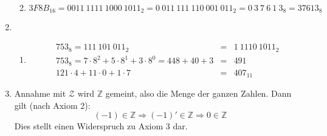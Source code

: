 \documentclass[DIN, pagenumber=false, fontsize=11pt, parskip=half]{scrartcl}
\begin{document}
\begin{enumerate}
\begin{enumerate}
\begin{equation*}
                    \end{equation*}
                \item
                    \begin{equation*}
                        {3F8B}_{16} = {0011\ 1111\ 1000\ 1011}_2 = {0\ 011\ 111\ 110\ 001\ 011}_2 = {0\ 3\ 7\ 6\ 1\ 3}_8 = {37613}_8
                    \end{equation*}
            \end{enumerate}
        \item 
            \begin{enumerate}
                \item 
                    \begin{eqnarray*}
                        {753}_8 = {111\ 101\ 011}_2 &=& {1\ 1110\ 1011}_2 \\
                        {753}_8 = 7 \cdot 8^2 + 5 \cdot 8^1 + 3 \cdot 8^0 = 448 + 40 + 3 &=& 491\\
                        121 \cdot 4 + 11 \cdot 0 + 1 \cdot 7 &=& {407}_{11}
                    \end{eqnarray*}
            \end{enumerate}
        \item Annahme mit $\mathcal{Z}$ wird $\mathbb{Z}$ gemeint, also die Menge der ganzen Zahlen. Dann gilt (nach Axiom 2):
            \begin{equation*}
                (-1) \in \mathbb{Z} \Rightarrow  (-1)' \in \mathbb{Z} \Rightarrow 0 \in \mathbb{Z}
            \end{equation*}
            Dies stellt einen Widerspruch zu Axiom 3 dar.
    \end{enumerate}
\end{document}
